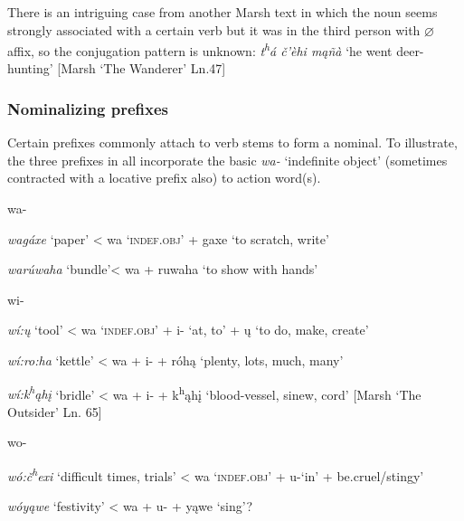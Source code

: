 \documentclass[output=paper]{LSP/langsci}
\begin{document}
There is an intriguing case from another Marsh text in which the noun seems strongly associated with a certain verb but it was in the third person with $\varnothing$ affix, so the conjugation pattern is unknown: \textit{t\textsuperscript{h}á \v{c}'\`ehi m\k{a}\~n\`a} `he went deer-hunting' [Marsh `The Wanderer' Ln.47]  

\subsubsection{Nominalizing prefixes} 
Certain prefixes commonly attach to verb stems to form a nominal.  To illustrate, the three prefixes in  all incorporate the basic \textit{wa-} `indefinite object' (sometimes contracted with a locative prefix also) to action word(s).

\begin{exe}
\ex \label{wawiwo}
\begin{xlist}
\ex wa-     	       											
	       	
\textit{wagáxe}       `paper'  < wa `\textsc{indef.obj}' + gaxe `to scratch, write'
		
\textit{warúwaha}  `bundle'< wa  + ruwaha `to show with hands'
            
\ex wi-															

\textit{w\'i:\k{u}}    `tool'    < wa `\textsc{indef.obj}' + i- `at, to' + \k{u} `to do, make, create'
            
\textit{w\'i:ro:ha}  `kettle' < wa + i-  + r\'oh\k{a} `plenty, lots, much, many'

\textit{w\'i:k\textsuperscript{h}\k{a}h\k{i}} `bridle'  < wa + i-  + k\textsuperscript{h}\k{a}h\k{i} `blood-vessel, sinew, cord'   [Marsh `The Outsider' Ln. 65]\footnotemark

\ex wo-  															

\textit{w\'o:\v{c}\textsuperscript{h}exi}   `difficult times, trials' < wa `\textsc{indef.obj}' + u-`in' + be.cruel/stingy'
	
\textit{w\'oy\k{a}we}  `festivity' < wa + u- + y\k{a}we `sing'? \footnotemark
\end{xlist}
\end{exe}
\end{document}
